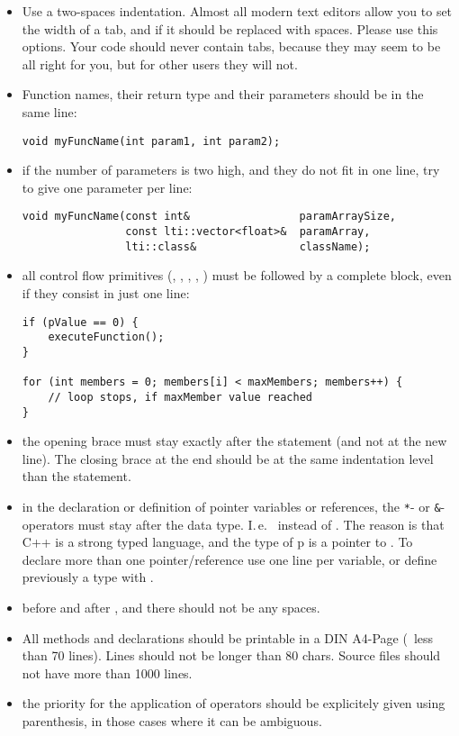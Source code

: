 \begin{itemize}
\item Use a two-spaces indentation.  Almost all modern text editors allow you
  to set the width of a tab, and if it should be replaced with spaces.  Please
  use this options.  Your code should never contain tabs, because they may
  seem to be all right for you, but for other users they will not.
\item Function names, their return type and their parameters should be in the
  same line:
\begin{verbatim}
void myFuncName(int param1, int param2);
\end{verbatim}
\item if the number of parameters is two high, and they do not fit in one
  line, try to give one parameter per line:
\begin{verbatim}
void myFuncName(const int&                 paramArraySize,
                const lti::vector<float>&  paramArray,
                lti::class&                className);
\end{verbatim}
\item all control flow primitives (, ,
, , ) must be followed by a complete block,
even if they consist in just one line:
\begin{verbatim}
if (pValue == 0) {
    executeFunction();
}

for (int members = 0; members[i] < maxMembers; members++) {
    // loop stops, if maxMember value reached
}
\end{verbatim}
\item the opening brace must stay exactly after the statement (and not at the
  new line).  The closing brace at the end should be at the same indentation
  level than the statement.
\item in the declaration or definition of pointer variables or references, the
  \verb+*+- or \verb+&+-operators must stay after the data type.  I.\,e.\
   instead of .  The reason is that C++ is a strong
  typed language, and the type of p is a pointer to \code{char}.  To declare
  more than one pointer/reference use one line per variable, or define
  previously a type with \code{typedef}.
\item before and after , \code{->} and \code{::} there should not be
  any spaces.
\item All methods and declarations should be printable in a DIN A4-Page (\ie\
  less than 70 lines).  Lines should not be longer than 80 chars.  Source
  files should not have more than 1000 lines.
\item the priority for the application of operators should be explicitely
  given using parenthesis, in those cases where it can be ambiguous.
\end{itemize}

